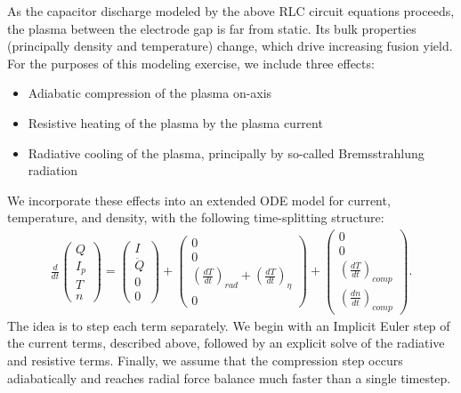 \documentclass{article}
\begin{document}
As the capacitor discharge modeled by the above RLC circuit equations proceeds, the plasma
between the electrode gap is far from static.
Its bulk properties (principally density and temperature) change, which drive increasing
fusion yield.
For the purposes of this modeling exercise, we include three effects:
\begin{itemize}
    \item Adiabatic compression of the plasma on-axis
    \item Resistive heating of the plasma by the plasma current
    \item Radiative cooling of the plasma, principally by so-called Bremsstrahlung radiation
\end{itemize}
We incorporate these effects into an extended ODE model for current, temperature, and density,
with the following time-splitting structure:
\begin{align*}
\frac{d}{dt} \begin{pmatrix}
Q \\ I_p \\ T \\ n
\end{pmatrix}
=
\begin{pmatrix}
I \\ \ddot{Q} \\ 0 \\ 0
\end{pmatrix}
+
\begin{pmatrix}
0 \\ 0 \\
\left( \frac{d T}{dt} \right)_{rad} + \left( \frac{d T}{dt} \right)_{\eta} \\
0
\end{pmatrix}
+
\begin{pmatrix}
0 \\ 0 \\
\left( \frac{dT}{dt} \right)_{comp} \\
\left( \frac{dn}{dt} \right)_{comp}
\end{pmatrix}.
\end{align*}
The idea is to step each term separately. 
We begin with an Implicit Euler step of the current terms, described above,
followed by an explicit solve of the radiative and resistive terms.
Finally, we assume that the compression step occurs adiabatically and reaches
radial force balance much faster than a single timestep.
\end{document}
